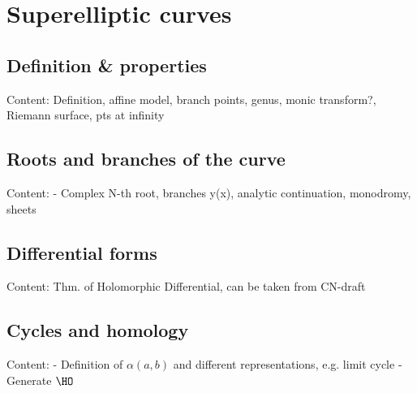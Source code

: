 \documentclass[main.tex]{subfiles}
\begin{document}
  \section{Superelliptic curves}

  \subsection{Definition \& properties}
    Content: Definition, affine model, branch points, genus, monic transform?, Riemann surface, pts at infinity
  
  \subsection{Roots and branches of the curve}
    Content: - Complex N-th root, branches y(x), analytic continuation, monodromy, sheets
  
  \subsection{Differential forms}
    Content: Thm. of Holomorphic Differential, can be taken from CN-draft
  
  \subsection{Cycles and homology}
    Content: - Definition of $\alpha(a,b)$ and different representations, e.g. limit cycle
	     - Generate $\HO$
  
\end{document}
